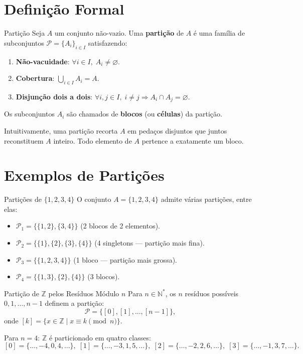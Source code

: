 \documentclass[12pt,a4paper]{book}
\begin{document}
\section{Definição Formal}

\begin{definicao}{Partição}{}
Seja $A$ um conjunto não-vazio. Uma \textbf{partição} de $A$ é uma família de subconjuntos $\mathcal{P} = \{A_i\}_{i \in I}$ satisfazendo:
\begin{enumerate}[label=(P\arabic*)]
  \item \textbf{Não-vacuidade}: $\forall i \in I,\; A_i \neq \varnothing$.
  \item \textbf{Cobertura}: $\displaystyle\bigcup_{i \in I} A_i = A$.
  \item \textbf{Disjunção dois a dois}: $\forall i,j \in I,\; i \neq j \Rightarrow A_i \cap A_j = \varnothing$.
\end{enumerate}
Os subconjuntos $A_i$ são chamados de \textbf{blocos} (ou \textbf{células}) da partição.
\end{definicao}

Intuitivamente, uma partição recorta $A$ em pedaços disjuntos que juntos reconstituem $A$ inteiro. Todo elemento de $A$ pertence a exatamente um bloco.

\section{Exemplos de Partições}

\begin{exemplo}{Partições de $\{1,2,3,4\}$}{}
O conjunto $A = \{1,2,3,4\}$ admite várias partições, entre elas:
\begin{itemize}
  \item $\mathcal{P}_1 = \{\{1,2\},\{3,4\}\}$ (2 blocos de 2 elementos).
  \item $\mathcal{P}_2 = \{\{1\},\{2\},\{3\},\{4\}\}$ (4 singletons — partição mais fina).
  \item $\mathcal{P}_3 = \{\{1,2,3,4\}\}$ (1 bloco — partição mais grossa).
  \item $\mathcal{P}_4 = \{\{1,3\},\{2\},\{4\}\}$ (3 blocos).
\end{itemize}
\end{exemplo}

\begin{exemplo}{Partição de $\mathbb{Z}$ pelos Resíduos Módulo $n$}{}
Para $n \in \mathbb{N}^*$, os $n$ resíduos possíveis $0, 1, \dots, n-1$ definem a partição:
\[
  \mathcal{P} = \{[0],[1],\dots,[n-1]\},
\]
onde $[k] = \{x \in \mathbb{Z} \mid x \equiv k \pmod{n}\}$.

Para $n = 4$: $\mathbb{Z}$ é particionado em quatro classes:
\[
  [0]=\{\dots,-4,0,4,\dots\},\;[1]=\{\dots,-3,1,5,\dots\},\;[2]=\{\dots,-2,2,6,\dots\},\;[3]=\{\dots,-1,3,7,\dots\}.
\]
\end{exemplo}
\end{document}
